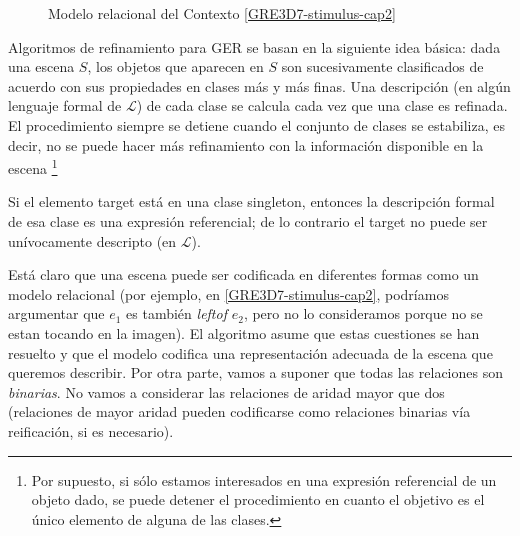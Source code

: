 \begin{figure}[ht]
\begin{center}
\caption{Modelo relacional del Contexto \ref{GRE3D7-stimulus-cap2}}
\label{GRE3D7-stimulus-graph}
\end{center}
\end{figure}

Algoritmos de refinamiento para GER se basan en la siguiente idea b\'asica:
dada una escena $S$, los objetos que aparecen en $S$ son sucesivamente
clasificados de acuerdo con sus propiedades en clases m\'as y m\'as finas. 
Una descripci\'on (en alg\'un lenguaje formal de $\mathcal{L}$) de cada
clase se calcula cada vez que una clase es refinada. El procedimiento siempre
se detiene cuando el conjunto de clases se estabiliza, es decir, no se puede hacer m\'as refinamiento
con la informaci\'on disponible en la escena \footnote{Por supuesto, si s\'olo estamos interesados en una expresi\'on referencial de un objeto dado, se puede detener el procedimiento en cuanto el objetivo es el
   \'unico elemento de alguna de las clases.}

Si el elemento target est\'a en
una clase singleton, entonces la descripci\'on formal de esa clase es una
expresi\'on referencial; de lo contrario el target no puede ser un\'{i}vocamente
descripto (en $\mathcal{L}$).

Est\'a claro que una escena puede ser codificada en diferentes formas como un
modelo relacional (por ejemplo, en \ref{GRE3D7-stimulus-cap2}, podr\'{i}amos argumentar que
$e_1$ es tambi\'en \emph{leftof} $e_2$, pero no lo consideramos porque no se estan 
tocando en la imagen). El algoritmo asume que estas cuestiones se han resuelto y que el modelo codifica una representaci\'on adecuada de la escena que
queremos describir. Por otra parte, vamos a suponer que todas las relaciones son
\emph{binarias}. No vamos a considerar las relaciones de aridad mayor que
dos (relaciones de mayor aridad pueden codificarse como relaciones binarias v\'{i}a
reificaci\'on, si es necesario).

